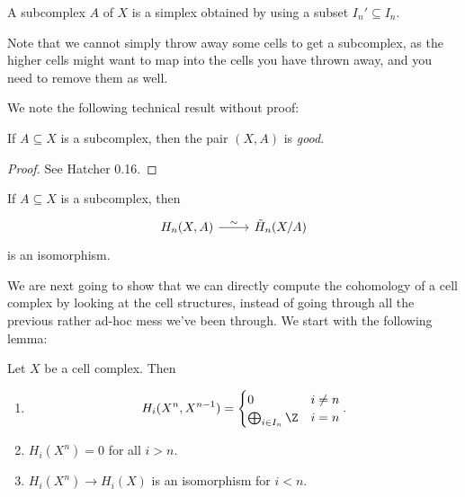 \documentclass[a4paper]{article}
\begin{document}
\begin{defi}[Subcomplex]
  A subcomplex $A$ of $X$ is a simplex obtained by using a subset $I_n' \subseteq I_n$.
\end{defi}
Note that we cannot simply throw away some cells to get a subcomplex, as the higher cells might want to map into the cells you have thrown away, and you need to remove them as well.

We note the following technical result without proof:
\begin{lemma}
  If $A \subseteq X$ is a subcomplex, then the pair $(X, A)$ is \emph{good}.
\end{lemma}

\begin{proof}
  See Hatcher 0.16.
\end{proof}

\begin{cor}
  If $A \subseteq X$ is a subcomplex, then
  \[
    \begin{tikzcd}
      H_n(X, A) \ar[r, "\sim"] & \tilde{H}_n(X/A)
    \end{tikzcd}
  \]
  is an isomorphism.
\end{cor}

We are next going to show that we can directly compute the cohomology of a cell complex by looking at the cell structures, instead of going through all the previous rather ad-hoc mess we've been through. We start with the following lemma:
\begin{lemma}
  Let $X$ be a cell complex. Then
  \begin{enumerate}
    \item
      \[
        H_i(X^n, X^{n - 1}) =
        \begin{cases}
          0 & i \not= n\\
          \bigoplus_{i \in I_n} \Z & i = n
        \end{cases}.
      \]
    \item $H_i(X^n) = 0$ for all $i > n$.
    \item $H_i(X^n) \to H_i(X)$ is an isomorphism for $i < n$.
  \end{enumerate}
\end{lemma}
\end{document}
